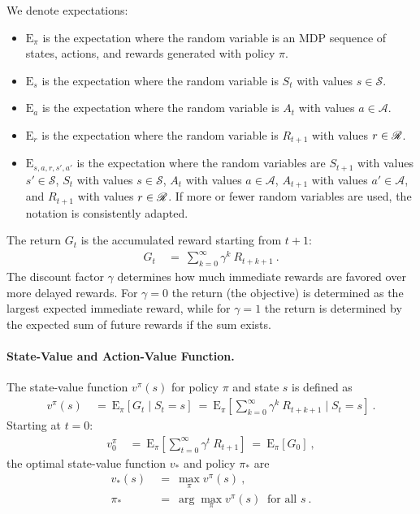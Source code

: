 \documentclass{article}
\newcommand{\sA}{\mathscr{A}} \newcommand{\sB}{\mathscr{B}}
\newcommand{\sS}{\mathscr{S}} \newcommand{\sT}{\mathscr{T}}
\newcommand\EXP{\mathbf{\mathrm{E}}}
\begin{document}
\begin{appendices}
We denote expectations:
\begin{itemize}
\item $\EXP_{\pi}$ is the expectation where
 the random variable is an MDP sequence of states, actions, and rewards
 generated with policy $\pi$.
\item $\EXP_{s}$ is the expectation where
 the random variable is $S_t$ with values $s \in \sS$.
\item $\EXP_{a}$ is the expectation where
 the random variable is $A_t$ with values $a \in \sA$.
\item $\EXP_{r}$ is the expectation where
 the random variable is $R_{t+1}$ with values $r \in \mathscr{R}$.
\item $\EXP_{s,a,r,s',a'}$ is the expectation where
  the random variables are $S_{t+1}$ with values $s' \in \sS$,
  $S_t$ with values $s \in \sS$, $A_t$ with values $a \in \sA$, 
  $A_{t+1}$ with values $a' \in \sA$,  and $R_{t+1}$ with values $r \in \mathscr{R}$.
  If more or fewer random variables are used, the notation is
  consistently adapted. 
\end{itemize}


The return $G_t$ is the accumulated reward starting from $t+1$:
\begin{align}
  G_t \ &= \ \sum_{k=0}^{\infty}  \gamma^k \ R_{t+k+1} \ .
\end{align}
The discount factor $\gamma$ determines how much immediate rewards are
favored over more delayed rewards.
For $\gamma=0$ the return (the objective) is determined
as the largest expected immediate reward, while
for $\gamma=1$ the return is determined by the
expected sum of future rewards if the sum exists.


\paragraph{State-Value and Action-Value Function.}
The state-value function $v^{\pi}(s)$ for policy $\pi$ and state $s$
is defined as
\begin{align}
  v^{\pi}(s) \ &= \ \EXP_{\pi} \left[ G_t \mid S_t=s \right]
   \ = \ \EXP_{\pi} \left[\sum_{k=0}^{\infty}  \gamma^k
     \ R_{t+k+1} \mid S_t=s \right] \ .  
\end{align}
Starting at $t=0$:
\begin{align}
  v_0^{\pi} \ &= \ \EXP_{\pi} \left[\sum_{t=0}^{\infty} \gamma^{t}
    \ R_{t+1}\right] \ = \ \EXP_{\pi} \left[G_0\right] \ ,
\end{align}
the optimal state-value function $v_{*}$ and policy $\pi_{*}$ are
\begin{align}
  v_{*}(s) \ &= \ \max_{\pi} v^{\pi}(s) \ , \\
 \pi_{*} \ &= \ \arg\max_{\pi} v^{\pi}(s) \ \text{ for all } s \ .
\end{align}



\end{appendices}
\end{document}
